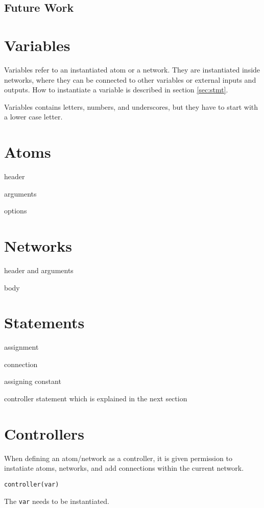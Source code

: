 \subsection{Future Work}


\section{Variables}
Variables refer to an instantiated atom or a network. They are
instantiated inside networks, where they can be connected to other
variables or external inputs and outputs. How to instantiate a
variable is described in section \autoref{sec:stmt}.

Variables contains letters, numbers, and underscores, but they have to
start with a lower case letter.

\section{Atoms}\label{sec:atom}
header

arguments

options

\section{Networks}\label{sec:net}
header and arguments

body

\section{Statements} \label{sec:atom}
assignment

connection

assigning constant

controller statement which is explained in the next section

\section{Controllers}
When defining an atom/network as a controller, it is given permission
to instatiate atoms, networks, and add connections within the current
network.

\begin{verbatim}
controller(var)
\end{verbatim}

The \verb#var# needs to be instantiated.
